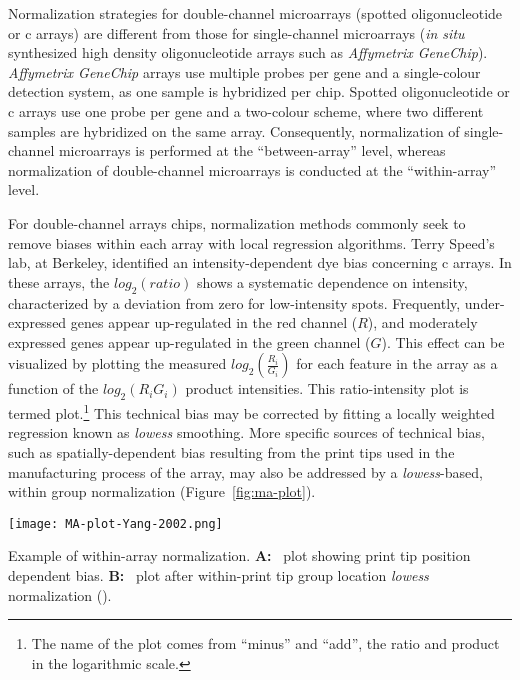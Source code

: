 Normalization strategies for double-channel microarrays (spotted oligonucleotide
or c arrays\cite{schena_quantitative_1995}) are different from
those for single-channel microarrays (\emph{in situ} synthesized high density
oligonucleotide arrays\cite{lockhart_expression_1996} such as \emph{Affymetrix
  GeneChip}).  \emph{Affymetrix GeneChip} arrays use multiple probes per gene
and a single-colour detection system, as one sample is hybridized per chip.
Spotted oligonucleotide or c arrays use one probe per gene and a
two-colour scheme, where two different samples are hybridized on the same array.
Consequently, normalization of single-channel microarrays is performed at the
``between-array'' level, whereas normalization of double-channel microarrays is
conducted at the ``within-array'' level.\cite{do_normalization_2006}

For double-channel arrays chips, normalization methods commonly seek to remove
biases within each array with local regression algorithms.  Terry Speed's lab,
at Berkeley, identified an intensity-dependent dye bias concerning
c arrays.  In these arrays, the $log_{2} (ratio)$ shows a
systematic dependence on intensity, characterized by a deviation from zero for
low-intensity spots.  Frequently, under-expressed genes appear up-regulated in
the red channel ($R$), and moderately expressed genes appear up-regulated in the
green channel ($G$).
This effect can be visualized by plotting the measured
$log_{2}(\frac{R_{i}}{G_{i}})$ for each feature in the array as a function of
the $log_{2}(R_{i}G_{i})$ product intensities.  This ratio-intensity plot is
termed  plot.\footnote{The name of the plot comes from ``minus''
  and ``add'', the ratio and product in the logarithmic scale.}  This technical
bias may be corrected by fitting a locally weighted regression known as
\emph{lowess} smoothing.\cite{yang_normalization_2001} More specific sources of
technical bias, such as spatially-dependent bias resulting from the print tips
used in the manufacturing process of the array, may also be addressed by a
\emph{lowess}-based, within group normalization (Figure~\ref{fig:ma-plot}).

\begin{marginfigure}%
  \begin{center}
    \texttt{[image: MA-plot-Yang-2002.png]}
    \caption[Within-array normalization]{Example of within-array normalization.
      \textbf{A:}~ plot showing print tip position dependent bias.
      \textbf{B:}~ plot after within-print tip group location
      \emph{lowess} normalization (\citealp{yang_normalization_2002}).}
    \label{fig:ma-plot}%
  \end{center}
\end{marginfigure}

